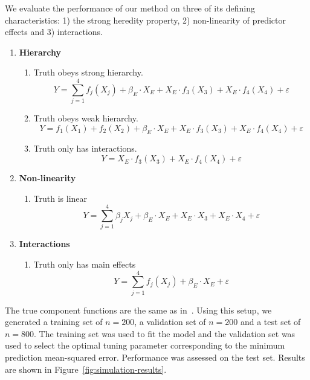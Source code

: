 \documentclass[12pt,letter]{article}\usepackage[]{graphicx}\usepackage[]{color}
\begin{document}
We evaluate the performance of our method on three of its defining characteristics: 1) the strong heredity property, 2) non-linearity of predictor effects and 3) interactions.


\begin{enumerate}
	\item \textbf{Hierarchy}
	\begin{enumerate}
		\item Truth obeys strong hierarchy. \[Y = \sum_{j=1}^{4} f_j(X_{j}) + \beta_E \cdot X_{E} +  X_{E} \cdot f_3(X_{3}) + X_{E} \cdot f_4(X_{4}) + \varepsilon\]
		\item Truth obeys weak hierarchy.
		\[Y = f_1(X_{1}) + f_2(X_{2}) + \beta_E \cdot X_{E} +  X_{E} \cdot f_3(X_{3}) + X_{E} \cdot f_4(X_{4}) + \varepsilon\]
		\item Truth only has interactions.  \[Y =  X_{E} \cdot f_3(X_{3}) + X_{E} \cdot f_4(X_{4}) + \varepsilon\]
	\end{enumerate}
	
	\item \textbf{Non-linearity}
	\begin{enumerate}
		\item Truth is linear \[Y = \sum_{j=1}^{4}\beta_j X_{j} + \beta_E \cdot X_{E} +  X_{E} \cdot X_{3} + X_{E} \cdot X_{4} + \varepsilon\]
	\end{enumerate}
	
	\item \textbf{Interactions}
	\begin{enumerate}
		
		\item Truth only has main effects  \[Y = \sum_{j=1}^{4} f_j(X_{j}) + \beta_E \cdot X_{E} + \varepsilon\]
	\end{enumerate}
	
	
\end{enumerate}

The true component functions are the same as in~\citep{lin2006component,huang2010variable}. Using this setup, we generated a training set of $n=200$, a validation set of $n=200$ and a test set of $n=800$. The training set was used to fit the model and the validation set was used to select the optimal tuning parameter corresponding to the minimum prediction mean-squared error. Performance was assessed on the test set. Results are shown in Figure~\ref{fig:simulation-results}.
\end{document}
